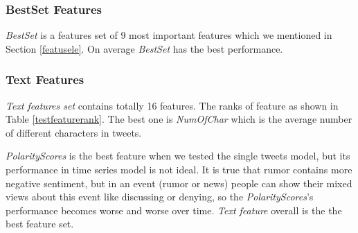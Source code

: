  \subsubsection{BestSet Features} 
\emph{BestSet} is a features set of 9 most important features which we mentioned in Section \ref{featusele}. On average \emph{BestSet} has the best performance.
 
 \subsubsection{Text Features} 
 \emph{Text features set} contains totally 16 features. The ranks of feature as shown in Table \ref{testfeaturerank}. The best one is \emph{NumOfChar} which is the average number of different characters in tweets. 
  
 \emph{PolarityScores} is the best feature when we tested the single tweets model, but its performance in time series model is not ideal. It is true that rumor contains more negative sentiment, but in an event (rumor or news) people can show their mixed views about this event \cite{mendoza2010twitter} \cite{starbird2014rumors} like discussing or denying, so the \emph{PolarityScores}'s performance becomes worse and worse over time. 
  \emph{Text feature} overall is the the best feature set.
 
 \begin{table}[!h]
 \centering
{}
\caption{Rank of Part of Text Feature}
\label{testfeaturerank}
\end{table}
